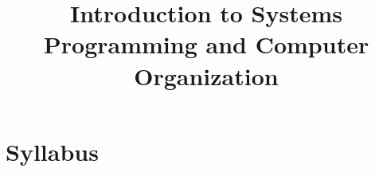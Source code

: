 \documentclass{notes}
\title{Introduction to Systems Programming and Computer Organization}
\begin{document}
\section*{Syllabus}
\end{document}
